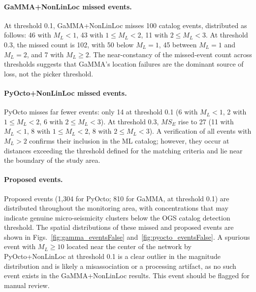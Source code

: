 \paragraph{GaMMA+NonLinLoc missed events.}
At threshold 0.1, GaMMA+NonLinLoc misses 100 catalog events, distributed as
follows: 46 with $M_L < 1$, 43 with $1 \leq M_L < 2$, 11 with $2 \leq M_L < 3$.
At threshold 0.3, the missed count is 102, with 50 below $M_L = 1$, 45 between
$M_L = 1$ and $M_L = 2$, and 7 with $M_L \geq 2$. The near-constancy of the
missed-event count across thresholds suggests that GaMMA's location failures
are the dominant source of loss, not the picker threshold.

\paragraph{PyOcto+NonLinLoc missed events.}
PyOcto misses far fewer events: only 14 at threshold 0.1 (6 with $M_L < 1$, 2
with $1 \leq M_L < 2$, 6 with $2 \leq M_L < 3$). At threshold 0.3, $MS_E$ rise
to 27 (11 with $M_L < 1$, 8 with $1 \leq M_L < 2$, 8 with $2 \leq M_L < 3$). A
verification of all events with $M_L > 2$ confirms their inclusion in the ML
catalog; however, they occur at distances exceeding the threshold defined for
the matching criteria and lie near the boundary of the study area.

\paragraph{Proposed events.}
Proposed events (1,304 for PyOcto; 810 for GaMMA, at threshold 0.1) are
distributed throughout the monitoring area, with concentrations that may
indicate genuine micro-seismicity clusters below the OGS catalog detection
threshold. The spatial distributions of these missed and proposed events are
shown in Figs.~\ref{fig:gamma_eventsFalse} and~\ref{fig:pyocto_eventsFalse}. A
spurious event with $M_L \geq 10$ located near the center of the network by
PyOcto+NonLinLoc at threshold 0.1 is a clear outlier in the magnitude
distribution and is likely a misassociation or a processing artifact, as no
such event exists in the GaMMA+NonLinLoc results. This event should be flagged
for manual review.

